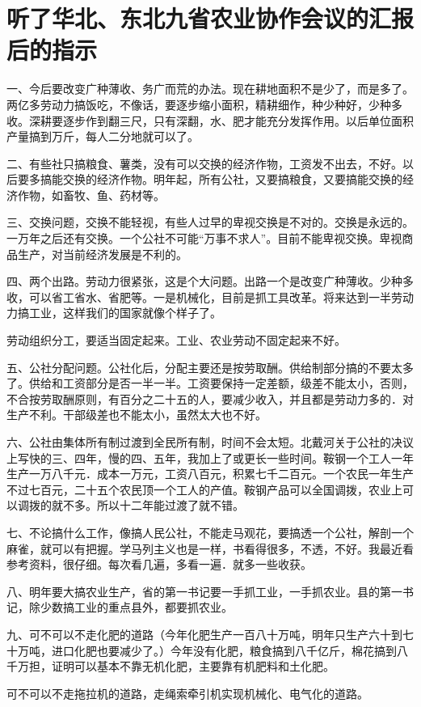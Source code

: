 \section[听了华北、东北九省农业协作会议的汇报后的指示（一九五八年十月）]{听了华北、东北九省农业协作会议的汇报后的指示}


一、今后要改变广种薄收、务广而荒的办法。现在耕地面积不是少了，而是多了。两亿多劳动力搞饭吃，不像话，要逐步缩小面积，精耕细作，种少种好，少种多收。深耕要逐步作到翻三尺，只有深翻，水、肥才能充分发挥作用。以后单位面积产量搞到万斤，每人二分地就可以了。

二、有些社只搞粮食、薯类，没有可以交换的经济作物，工资发不出去，不好。以后要多搞能交换的经济作物。明年起，所有公社，又要搞粮食，又要搞能交换的经济作物，如畜牧、鱼、药材等。

三、交换问题，交换不能轻视，有些人过早的卑视交换是不对的。交换是永远的。一万年之后还有交换。一个公社不可能“万事不求人”。目前不能卑视交换。卑视商品生产，对当前经济发展是不利的。

四、两个出路。劳动力很紧张，这是个大问题。出路一个是改变广种薄收。少种多收，可以省工省水、省肥等。一是机械化，目前是抓工具改革。将来达到一半劳动力搞工业，这样我们的国家就像个样子了。

劳动组织分工，要适当固定起来。工业、农业劳动不固定起来不好。

五、公社分配问题。公社化后，分配主要还是按劳取酬。供给制部分搞的不要太多了。供给和工资部分是否一半一半。工资要保持一定差额，级差不能太小，否则，不合按劳取酬原则，有百分之二十五的人，要减少收入，并且都是劳动力多的．对生产不利。干部级差也不能太小，虽然太大也不好。

六、公社由集体所有制过渡到全民所有制，时间不会太短。北戴河关于公社的决议上写快的三、四年，慢的四、五年，我加上了或更长一些时间。鞍钢一个工人一年生产一万八千元．成本一万元，工资八百元，积累七千二百元。一个农民一年生产不过七百元，二十五个农民顶一个工人的产值。鞍钢产品可以全国调拨，农业上可以调拨的就不多。所以十二年能过渡了就不错。

七、不论搞什么工作，像搞人民公社，不能走马观花，要搞透一个公社，解剖一个麻雀，就可以有把握。学马列主义也是一样，书看得很多，不透，不好。我最近看参考资料，很仔细。每次看几遍，多看一遍．就多一些收获。

八、明年要大搞农业生产，省的第一书记要一手抓工业，一手抓农业。县的第一书记，除少数搞工业的重点县外，都要抓农业。

九、可不可以不走化肥的道路（今年化肥生产一百八十万吨，明年只生产六十到七十万吨，进口化肥也要减少了。）今年没有化肥，粮食搞到八千亿斤，棉花搞到八千万担，证明可以基本不靠无机化肥，主要靠有机肥料和土化肥。

可不可以不走拖拉机的道路，走绳索牵引机实现机械化、电气化的道路。


